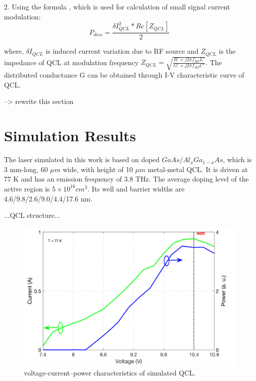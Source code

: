 \documentclass[11pt,final]{scrbook}
\begin{document}
2. Using the formula \cite{ramo2008fields}, which is used for calculation of small signal current modulation:
\begin{equation}
{ P }_{ diss }=\frac { \delta { I }_{ QCL }^{ 2 }*Re[{ Z }_{ QCL }] }{ 2 }
\end{equation}

where, $\delta { I }_{ QCL }$ is induced current variation due to RF source and ${ Z }_{ QCL }$ is the impedance of QCL at modulation frequency $Z_{QCL}=\sqrt{\frac{R'+j2\pi f_{RF}L'}{G'+j2\pi f_{RF}C'}}$. The distributed conductance G can be obtained through I-V characteristic curve of QCL.

--> rewrite this section 

\chapter{Simulation Results}
The laser simulated in this work is based on doped $GaAs/Al_{x}Ga_{1-x}As$, which is 3 mm-long, 60 $\mu m$ wide, with height of 10 $\mu m$ metal-metal QCL. It is driven at 77 K and has an emission frequency of 3.8 THz. The average doping level of the active region is $5\times 10^{16} cm^{3}$. Its well and barrier widths are 4.6/9.8/2.6/9.0/4.4/17.6 nm.

...QCL structure...

\begin{figure}[htbp]
\begin{center}
\includegraphics[scale=0.6]{images/IVCURVE.pdf}
\caption{voltage-current–power characteristics of simulated QCL.}
\label{fig:IVcurve}
\end{center}
\end{figure}
\end{document}

